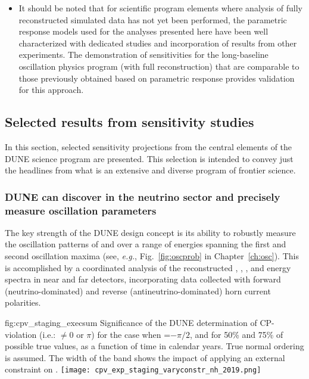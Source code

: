 \begin{itemize}
\item It should be noted that for scientific program elements where
      analysis of fully reconstructed simulated data has 
      not yet been performed, the parametric response models used for the analyses presented here have
      been well characterized with dedicated studies
      and incorporation of results from other experiments.
      The demonstration of sensitivities for the long-baseline
      oscillation physics program (with full reconstruction) 
      that are comparable to those
      previously obtained based on parametric response
      provides validation for this approach.
\end{itemize}


\subsection{Selected results from sensitivity studies}
\label{sec:exec-sensitiv-results}

In this section, selected sensitivity projections from the 
central elements of the DUNE science program are presented.  
This selection is intended to convey just the headlines from 
what is an extensive and diverse program of frontier science.

\subsubsection{DUNE can discover  in the neutrino 
sector and precisely measure oscillation parameters}

The key strength of the DUNE design concept is its ability to 
robustly measure the oscillation patterns of \numu and \anumu 
over a range of energies spanning the first and second 
oscillation maxima (see, {\sl e.g.},  Fig.~\ref{fig:oscprob} 
in Chapter~\ref{ch:osc}). 
This is accomplished by a coordinated analysis of the 
reconstructed \numu, \anumu, \nue, and \anue energy spectra 
in near and far detectors, 
incorporating data collected with forward (neutrino-dominated) 
and reverse (antineutrino-dominated) horn current polarities.  

\begin{dunefigure}{fig:cpv_staging_execsum}
{Significance of the DUNE determination of CP-violation (i.e.: \deltacp 
$\neq 0$ or $\pi$) for the case when \deltacp=$-\pi/2$, and for 50\% and 
75\% of possible true \deltacp values, as a function of time in calendar 
years. True normal ordering is assumed. The width of the band shows the 
impact of applying an external constraint on .}
\texttt{[image: cpv\_exp\_staging\_varyconstr\_nh\_2019.png]}
\end{dunefigure}

